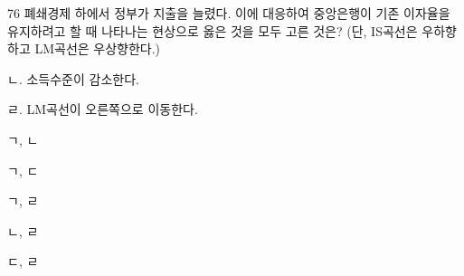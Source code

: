 \begin{question}{76}
폐쇄경제 하에서 정부가 지출을 늘렸다. 이에 대응하여 중앙은행이 기존 이자율을 유지하려고 할 때 나타나는 현상으로 옳은 것을 모두 고른 것은? (단, IS곡선은 우하향하고 LM곡선은 우상향한다.)
\begin{framedtext}
ㄴ. 소득수준이 감소한다. \par
{}ㄹ. LM곡선이 오른쪽으로 이동한다. \par
\end{framedtext}
\begin{choices}
  \item ㄱ, ㄴ
  \item ㄱ, ㄷ
  \item ㄱ, ㄹ
  \item ㄴ, ㄹ
  \item ㄷ, ㄹ
\end{choices}
\end{question}
